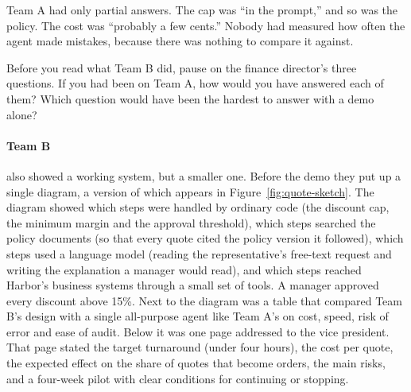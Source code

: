Team A had only partial answers. The cap was ``in the prompt,'' and so was the policy. The cost was ``probably a few cents.'' Nobody had measured how often the agent made mistakes, because there was nothing to compare it against.



\begin{thinkabout}
Before you read what Team B did, pause on the finance director's three questions. If you had been on Team A, how would you have answered each of them? Which question would have been the hardest to answer with a demo alone?
\end{thinkabout}

\paragraph{Team B} also showed a working system, but a smaller one. Before the demo they put up a single diagram, a version of which appears in Figure~\ref{fig:quote-sketch}. The diagram showed which steps were handled by ordinary code (the discount cap, the minimum margin and the approval threshold), which steps searched the policy documents (so that every quote cited the policy version it followed), which steps used a language model (reading the representative's free-text request and writing the explanation a manager would read), and which steps reached Harbor's business systems through a small set of tools. A manager approved every discount above 15\%. Next to the diagram was a table that compared Team B's design with a single all-purpose agent like Team A's on cost, speed, risk of error and ease of audit. Below it was one page addressed to the vice president. That page stated the target turnaround (under four hours), the cost per quote, the expected effect on the share of quotes that become orders, the main risks, and a four-week pilot with clear conditions for continuing or stopping.

